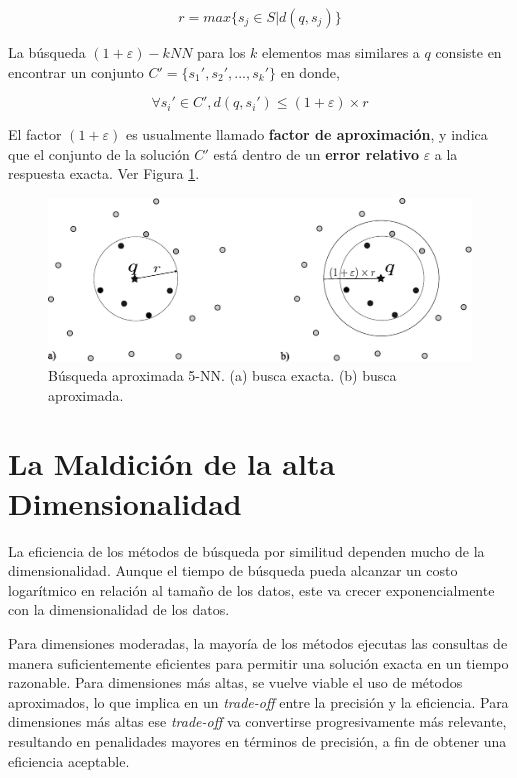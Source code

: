 \begin{equation}
r = max\{ s_j \in S | d(q, s_j)\}
\end{equation}

La búsqueda $(1 + \varepsilon)-kNN$  para los $k$ elementos  mas similares a $q$ consiste en encontrar un conjunto $C' = \{s_1', s_2', ..., s_k'\}$ en donde,

\begin{equation}
\forall s_i' \in C', d(q, s_i') \leq (1 + \varepsilon) \times r
\end{equation}

El factor $(1 + \varepsilon)$  es usualmente llamado  \textbf{factor de aproximación}, y indica que el conjunto de la solución $C'$ está dentro de un \textbf{error relativo}  $\varepsilon$  a la respuesta exacta.  Ver Figura \ref{fig:nearbyKnnQuery}.
\begin{figure}[htp]
\centering
\includegraphics[width=0.85\columnwidth]{chapter2/nearby_knn_query.pdf}
\caption{Búsqueda aproximada 5-NN. (a) busca exacta. (b) busca aproximada.  }
\label{fig:nearbyKnnQuery}
\end{figure}

 

\section{La Maldición  de la alta Dimensionalidad} \label{sec:madicao-dimensionalidade}

La eficiencia de los métodos de búsqueda por similitud dependen mucho de la dimensionalidad. Aunque el tiempo de búsqueda pueda alcanzar un costo logarítmico en relación al tamaño de los datos, este va crecer exponencialmente con la dimensionalidad de los datos.

Para dimensiones moderadas, la mayoría de los métodos ejecutas las consultas de manera suficientemente eficientes para permitir una solución exacta  en un tiempo razonable. Para dimensiones más altas, se vuelve viable el uso de métodos aproximados,  lo que implica en un \textit{trade-off}  entre la precisión y la eficiencia. Para dimensiones más altas ese \textit{trade-off}  va convertirse progresivamente más relevante, resultando en penalidades mayores en términos de precisión, a fin de obtener una eficiencia aceptable.

